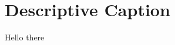 \documentclass{scrartcl}
\begin{document}
\section{Descriptive Caption}

Hello there
\end{document}
